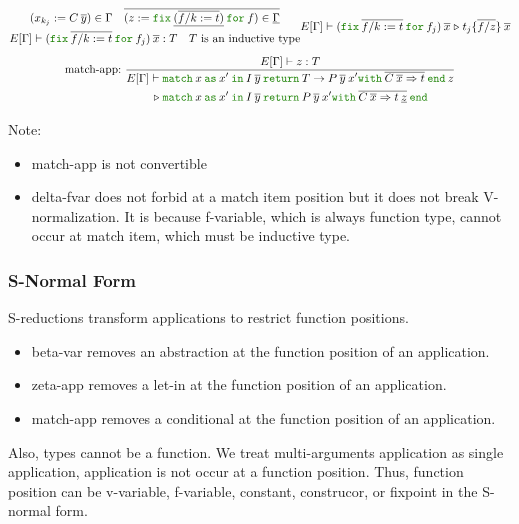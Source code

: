 \documentclass[a4paper,fleqn]{article}
\newcommand{\kwin}{\mbox{\color{mygreen}\ttfamily in}}
\newcommand{\kwmatch}{\mbox{\color{mygreen}\ttfamily match}}
\newcommand{\kwas}{\mbox{\color{mygreen}\ttfamily as}}
\newcommand{\kwreturn}{\mbox{\color{mygreen}\ttfamily return}}
\newcommand{\kwwith}{\mbox{\color{mygreen}\ttfamily with}}
\newcommand{\kwend}{\mbox{\color{mygreen}\ttfamily end}}
\newcommand{\kwfix}{\mbox{\color{mygreen}\ttfamily fix}}
\newcommand{\kwfor}{\mbox{\color{mygreen}\ttfamily for}}
\newcommand{\ofix}[2]{\kwfix\:{#1}\:\kwfor\:{#2}}
\newcommand{\breakrule}{\\[0.5em]}
\newcommand{\substm}[3]{#1\{\overline{#2/#3}\}}
\newcommand{\reltri}{\mathrel{\triangleright}}
\newcommand{\rep}[1]{\overline{#1}}
\begin{document}
\begin{gather*}
    {
      \begin{gathered}
        (x_{k_j} := C\:\rep{y}) \in \Gamma \quad
        \rep{(z := \ofix{\underline{(\rep{f/k:=t})}}{f}) \in \underline{\Gamma}} \\
        E[\Gamma] \vdash (\ofix{\rep{f/k:=t}}{f_j})\:\rep{x} : T \quad
        \text{$T$ is an inductive type}
      \end{gathered}
    }{
      E[\Gamma] \vdash
      (\ofix{\rep{f/k:=t}}{f_j})\:\rep{x}
      \reltri
      \substm{t_j}{f}{z} \:\rep{x}
    } \breakrule
  \text{match-app:}~
    \dfrac
    {
      E[\Gamma] \vdash z : T
    }{
      \begin{aligned}
        E[\Gamma] \vdash\; &
          \kwmatch\:x\:
          \kwas\:x'\:
          \kwin\:I\:\rep{y}\:
          \kwreturn\:{T \rightarrow P\:\rep{y}\:x'}
          \kwwith\:\rep{{C\: \rep{x}} \Rightarrow {t}}\:
          \kwend\:z \\
        \reltri\; &
          \kwmatch\:x\:
          \kwas\:x'\:
          \kwin\:I\:\rep{y}\:
          \kwreturn\:{P\:\rep{y}\:x'}
          \kwwith\:\rep{{C\: \rep{x}} \Rightarrow {t\:\underline{z}}}\:
          \kwend
      \end{aligned}
    }
\end{gather*}

{\small Note:
\begin{itemize}
  \item match-app is not convertible
  \item delta-fvar does not forbid at a match item position but it does not break V-normalization.
    It is because f-variable, which is always function type, cannot occur at match item, which must be inductive type.
\end{itemize}}

\subsubsection{S-Normal Form}\label{sec:s-normal-form}
S-reductions transform applications to restrict function positions.
\begin{itemize}
  \item beta-var removes an abstraction at the function position of an application.
  \item zeta-app removes a let-in at the function position of an application.
  \item match-app removes a conditional at the function position of an application.
\end{itemize}
Also, types cannot be a function.
We treat multi-arguments application as single application, application is not occur at a function position.
Thus, function position can be v-variable, f-variable, constant, construcor, or fixpoint in the S-normal form.
\end{document}

